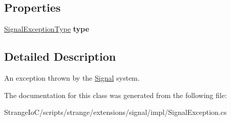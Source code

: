 \subsection*{Properties}
\begin{DoxyCompactItemize}
\item 
\hypertarget{classstrange_1_1extensions_1_1signal_1_1impl_1_1_signal_exception_a674f76dd508f7c09ea38b18256dd0da3}{\hyperlink{classstrange_1_1extensions_1_1signal_1_1api_1_1_signal_exception_type}{Signal\-Exception\-Type} {\bfseries type}}\label{classstrange_1_1extensions_1_1signal_1_1impl_1_1_signal_exception_a674f76dd508f7c09ea38b18256dd0da3}

\end{DoxyCompactItemize}


\subsection{Detailed Description}
An exception thrown by the \hyperlink{classstrange_1_1extensions_1_1signal_1_1impl_1_1_signal}{Signal} system. 

The documentation for this class was generated from the following file\-:\begin{DoxyCompactItemize}
\item 
Strange\-Io\-C/scripts/strange/extensions/signal/impl/Signal\-Exception.\-cs\end{DoxyCompactItemize}
